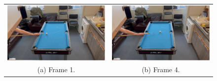 \documentclass[ %
                author={Finn Alexander Wilkinson},
                supervisor={Dr. Andrew Calway},
                degree={MEng},
                title={\centering A Mixed Reality Aim Assistant for Pool and Snooker},
                subtitle={},
                type={Enterprise},
                year={2021} ]{dissertation}
\begin{document}
\begin{figure}[h!]
    \centering
    \begin{tabular}{cc}
         \includegraphics[scale = 0.15]{Images/Eval/Path Estimate/Rebound 2 Slow/Frame 1 - Shot 2 - Rebound 1.PNG} & \includegraphics[scale = 0.15]{Images/Eval/Path Estimate/Rebound 2 Slow/Frame 4 - Shot 2 - Rebound 4.PNG} \\
         (a) Frame 1. & (b) Frame 4. \\ [6pt]

\end{tabular}
\end{figure}
\end{document}
